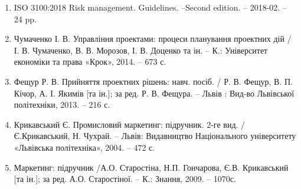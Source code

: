 \documentclass[oneside,14pt]{extarticle}
\begin{document}
\begin{enumerate}
	\item ISO 3100:2018 Risk management. Guidelines. –Second edition. – 2018-02. – 24 pp.
	\item Чумаченко І. В. Управління проектами: процеси планування проектних дій / І. В. Чумаченко, В. В. Морозов, І. В. Доценко та ін. – К.: Університет економіки та права «Крок», 2014. – 673 с.
	\item Фещур Р. В. Прийняття проектних рішень: навч. посіб. / Р. В. Фещур, В. П. Кічор, А. І. Якимів [та ін.]; за ред. Р. В. Фещура. – Львів : Вид-во Львівської політехніки, 2013. – 216 с.
	\item Крикавський Є. Промисловий маркетинг: підручник. 2-ге вид. / Є.Крикавський, Н. Чухрай. – Львів: Видавництво Національного університету «Львівська політехніка», 2004. – 472 с.
	\item Маркетинг: підручник /А.О. Старостіна, Н.П. Гончарова, Є.В. Крикавський [та ін.]; за ред. А.О. Старостіної. – К.: Знання, 2009. – 1070с.
\end{enumerate}
\end{document}
